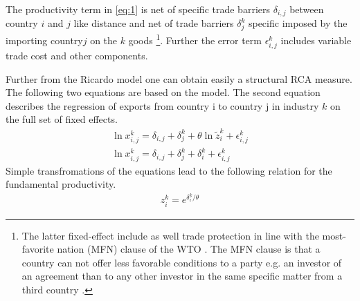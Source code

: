 The productivity term in \cref{eq:1} is net of specific trade barriers $\delta_{i,j}$ between country $i$ and $j$ like distance and net of trade barriers $\delta_j^k$ specific imposed by the importing country$j$ on the $k$ goods \footnote{The latter fixed-effect include as well  trade protection in line with the most-favorite nation (MFN) clause of the WTO \parencite{costinot}. The MFN clause is that a country can not offer less favorable conditions to a party e.g. an investor of an agreement than to any other investor in the same specific matter from a third country  \parencite{oecd-mfn}.}. Further the error term $\epsilon^k_{i,j}$ includes variable trade cost and other components. \par
Further from the Ricardo model one can obtain easily a structural RCA measure. The following two equations are based on the model. The second equation describes the regression of exports from country i to country j in industry $k$ on the full set of fixed effects.
   \begin{align} \label{eq:2}\ln {x}_{i,j}^k=\delta_{i,j}+\delta_j^k + \theta \ln\tilde{z}_i^k
+\epsilon^k_{i,j} \\
\ln {x}_{i,j}^k=\delta_{i,j}+\delta_j^k + \delta_i^k + \epsilon^k_{i,j}
 \end{align}
Simple transfromations of the equations lead to the following relation for the fundamental productivity.
 \begin{align*} 
  z^k_i=e^{{\delta_i^ k}/{\theta}} 
  \end{align*}
